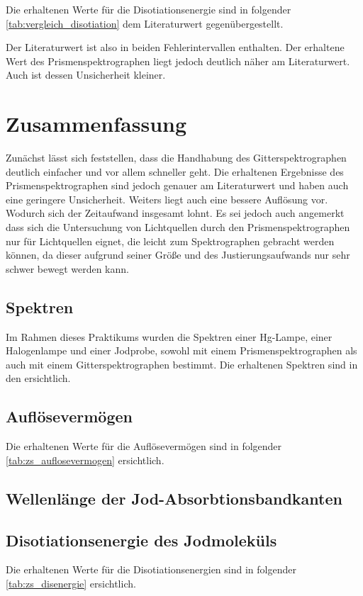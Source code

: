 \documentclass[12pt,english,ngerman]{scrartcl}
\begin{document}
Die erhaltenen Werte für die Disotiationsenergie sind in folgender \autoref{tab:vergleich_disotiation} dem 
Literaturwert gegenübergestellt.

Der Literaturwert ist also in beiden Fehlerintervallen enthalten. Der erhaltene Wert des Prismenspektrographen
liegt jedoch deutlich näher am Literaturwert. Auch ist dessen Unsicherheit kleiner.


\section{Zusammenfassung}\label{sec:zs}
Zunächst lässt sich feststellen, dass die Handhabung des Gitterspektrographen deutlich einfacher und vor allem schneller
geht. Die erhaltenen Ergebnisse des Prismenspektrographen sind jedoch genauer am Literaturwert und haben auch eine 
geringere Unsicherheit. Weiters liegt auch eine bessere Auflösung vor. Wodurch sich der Zeitaufwand insgesamt lohnt.
Es sei jedoch auch angemerkt dass sich die Untersuchung von Lichtquellen durch den Prismenspektrographen nur für 
Lichtquellen eignet, die leicht zum Spektrographen gebracht werden können, da dieser aufgrund seiner Größe und des 
Justierungsaufwands nur sehr schwer bewegt werden kann.

\subsection{Spektren}

Im Rahmen dieses Praktikums wurden die Spektren einer Hg-Lampe, einer Halogenlampe und einer Jodprobe, sowohl mit einem
Prismenspektrographen als auch mit einem Gitterspektrographen bestimmt.
Die erhaltenen Spektren sind in den 
ersichtlich.

\subsection{Auflösevermögen}

Die erhaltenen Werte für die Auflösevermögen sind in folgender \autoref{tab:zs_auflosevermogen} ersichtlich.


\subsection{Wellenlänge der Jod-Absorbtionsbandkanten}


\subsection{Disotiationsenergie des Jodmoleküls}

Die erhaltenen Werte für die Disotiationsenergien sind in folgender \autoref{tab:zs_disenergie} ersichtlich.








\newpage

\printbibliography
\listoffigures
\listoftables
\end{document}
